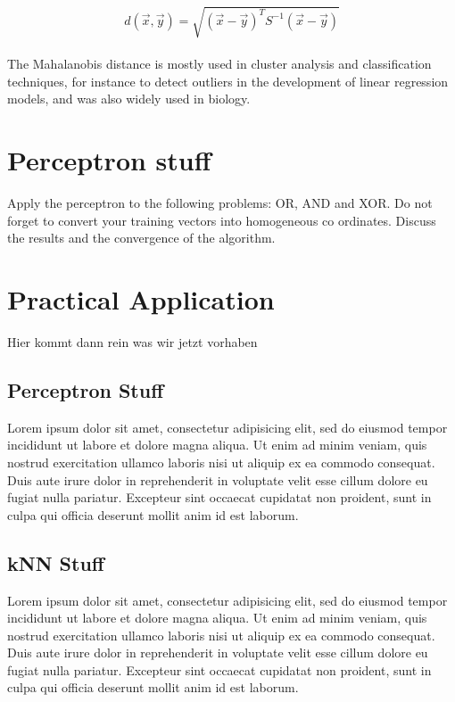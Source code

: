\documentclass{article}
\begin{document}
\begin{equation}
d(\vec{x},\vec{y}) = \sqrt{(\vec{x}-\vec{y})^TS^{-1}(\vec{x}-\vec{y})}
\end{equation}
\\
The Mahalanobis distance is mostly used in cluster analysis and classification techniques, for instance to detect outliers in the development of linear regression models, and was also widely used in biology.
\pagebreak

\section{Perceptron stuff}

Apply the perceptron to the following problems: OR, AND and XOR. Do not
forget to convert your training vectors into homogeneous co ordinates. Discuss
the results and the convergence of the algorithm. 

\section{Practical Application}

Hier kommt dann rein was wir jetzt vorhaben

\subsection{Perceptron Stuff}

Lorem ipsum dolor sit amet, consectetur adipisicing elit, sed do eiusmod tempor
incididunt ut labore et dolore magna aliqua. Ut enim ad minim veniam, quis
nostrud exercitation ullamco laboris nisi ut aliquip ex ea commodo consequat.
Duis aute irure dolor in reprehenderit in voluptate velit esse cillum dolore eu
fugiat nulla pariatur. Excepteur sint occaecat cupidatat non proident, sunt in
culpa qui officia deserunt mollit anim id est laborum.

\subsection{kNN Stuff}

Lorem ipsum dolor sit amet, consectetur adipisicing elit, sed do eiusmod tempor
incididunt ut labore et dolore magna aliqua. Ut enim ad minim veniam, quis
nostrud exercitation ullamco laboris nisi ut aliquip ex ea commodo consequat.
Duis aute irure dolor in reprehenderit in voluptate velit esse cillum dolore eu
fugiat nulla pariatur. Excepteur sint occaecat cupidatat non proident, sunt in
culpa qui officia deserunt mollit anim id est laborum.
\end{document}
